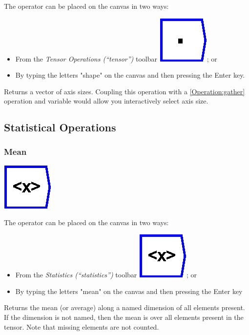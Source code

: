 The operator can be placed on the canvas in two ways:
\begin{itemize}
\item From the \emph{Tensor Operations (``tensor'')} toolbar \includegraphics{images/innerProduct};
or 
\item By typing the letters "shape" on the canvas and then pressing the
Enter key.
\end{itemize}
Returns a vector of axis sizes. Coupling this operation with a \ref{Operation:gather}
operation and variable would allow you interactively select axis size.

\subsection{Statistical Operations}

\subsubsection{Mean}

\label{Operation:mean}

\includegraphics{images/mean}

The operator can be placed on the canvas in two ways:
\begin{itemize}
\item From the \emph{Statistics (``statistics'')} toolbar \includegraphics{images/mean};
or 
\item By typing the letters "mean" on the canvas and then pressing the
Enter key
\end{itemize}
Returns the mean (or average) along a named dimension of all elements
present. If the dimension is not named, then the mean is over all
elements present in the tensor. Note that missing elements are not
counted.

